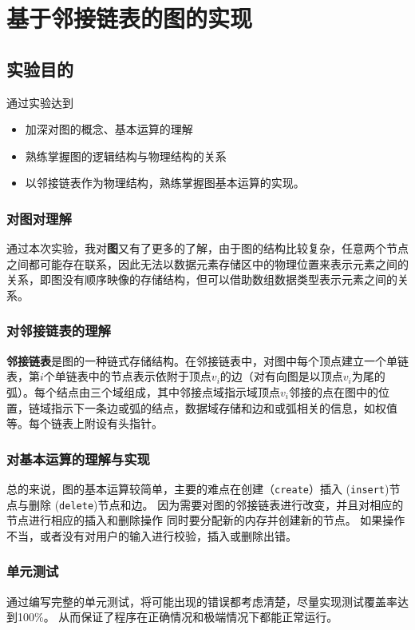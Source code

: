 \chapter{基于邻接链表的图的实现}\label{chapter:4}

\section{实验目的}\label{sec:test41}
通过实验达到
\begin{itemize}
    \item 加深对图的概念、基本运算的理解
    \item 熟练掌握图的逻辑结构与物理结构的关系
    \item 以邻接链表作为物理结构，熟练掌握图基本运算的实现。
\end{itemize}

\subsection{对图对理解}
通过本次实验，我对\textbf{图}又有了更多的了解，由于图的结构比较复杂，任意两个节点之间都可能存在联系，因此无法以数据元素存储区中的物理位置来表示元素之间的关系，即图没有顺序映像的存储结构，但可以借助数组数据类型表示元素之间的关系。~\cite{严蔚敏2002数据结构}
\subsection{对邻接链表的理解}
\textbf{邻接链表}是图的一种链式存储结构。在邻接链表中，对图中每个顶点建立一个单链表，第$i$个单链表中的节点表示依附于顶点$v_{i}$的边（对有向图是以顶点$v_{i}$为尾的弧）。每个结点由三个域组成，其中邻接点域指示域顶点$v_{i}$邻接的点在图中的位置，链域指示下一条边或弧的结点，数据域存储和边和或弧相关的信息，如权值等。每个链表上附设有头指针。~\cite{严蔚敏2002数据结构}
\newline
\subsection{对基本运算的理解与实现}
总的来说，图的基本运算较简单，主要的难点在创建（\texttt{create}）插入 (\texttt{insert})节点与删除 (\texttt{delete})节点和边。
因为需要对图的邻接链表进行改变，并且对相应的节点进行相应的插入和删除操作
同时要分配新的内存并创建新的节点。
如果操作不当，或者没有对用户的输入进行校验，插入或删除出错。
\subsection{单元测试}
通过编写完整的单元测试，将可能出现的错误都考虑清楚，尽量实现测试覆盖率达到100\%。
从而保证了程序在正确情况和极端情况下都能正常运行。

